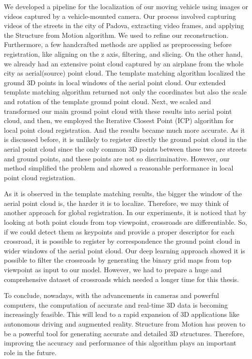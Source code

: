 \documentclass[11pt]{article}
\begin{document}
    We developed a pipeline for the localization of our moving vehicle using images or videos captured by
    a vehicle-mounted camera. Our process involved capturing videos of the streets in the city of Padova, extracting
    video frames, and applying the Structure from Motion algorithm. We used \cite{lindenberger2021pixsfm}
    to refine our reconstruction. Furthermore, a few handcrafted methods are applied as preprocessing before
    registration, like aligning on the z axis, filtering, and slicing. On the other hand, we already had an
    extensive point cloud captured by an airplane from the whole city as aerial(source) point cloud. The template matching algorithm
    localized the ground 3D points in local windows of the aerial point cloud. Our extended template matching
    algorithm returned not only the coordinates but also the scale and rotation of the template ground point cloud.
    Next, we scaled and transformed our main ground point cloud with these results into aerial point cloud, and then,
    we employed the Iterative Closest Point (ICP) algorithm for local point cloud registration.
    And the results became much more accurate. As it is discussed before, it is unlikely to register directly
    the ground point cloud in the aerial point cloud
    since the only common 3D points between these two are streets and ground points, and these points
    are not so discriminative. However, our method simplified the problem and showed a reasonable performance
    in local point cloud registration.

    As it is observed in the template matching results, the bigger the window of the aerial point cloud is, the harder it is to localize.
    Therefore, we may think of another approach for global registration. In our experiments, it is noticed that by
    looking at both point clouds from top viewpoint, crossroads are differentiable. So, if we could detect them as
    keypoints and provide a proper descriptor for each crossroad, it is possible to register by correspondence
    the ground point cloud in wider windows of the aerial point cloud. Our deep learning approach showed it is
    possible to filter the crossroads by generating the binary grid maps from top viewpoint as input to our model.
    However, we had to prepare a huge and comprehensive dataset of crossroads which needed a longer time for this thesis.

    To conclude, nowadays, with the advancements in cameras and powerful computers, the computation of accurate and
    real-time 3D data is becoming increasingly feasible. This will lead to a rapid expansion of 3D applications like autonomous
    driving and augmented reality. Structure from Motion has proven to be a powerful tool for generating accurate
    and detailed 3D structures. Therefore, improving the accuracy and performance of this algorithm plays an important role in the future.
\end{document}
